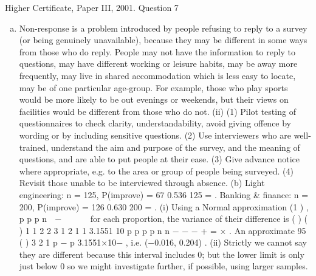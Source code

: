 \documentclass[a4paper,12pt]{article}
\begin{document}


Higher Certificate, Paper III, 2001. Question 7
\begin{enumerate}[(a)]
\item  Non-response is a problem introduced by people refusing to reply to a
survey (or being genuinely unavailable), because they may be different in
some ways from those who do reply. People may not have the information to
reply to questions, may have different working or leisure habits, may be away
more frequently, may live in shared accommodation which is less easy to
locate, may be of one particular age-group.
For example, those who play sports would be more likely to be out evenings
or weekends, but their views on facilities would be different from those who
do not.
(ii) (1) Pilot testing of questionnaires to check clarity,
understandability, avoid giving offence by wording or by
including sensitive questions.
(2) Use interviewers who are well-trained, understand the aim and
purpose of the survey, and the meaning of questions, and are
able to put people at their ease.
(3) Give advance notice where appropriate, e.g. to the area or
group of people being surveyed.
(4) Revisit those unable to be interviewed through absence.
(b) Light engineering: n = 125, P(improve) = 67 0.536
125
= .
Banking & finance: n = 200, P(improve) = 126 0.630
200
= .
(i) Using a Normal approximation (1 )
,
p p
p
n
 − 
 
 
for each proportion, the
variance of their difference is ( ) ( ) 1 1 2 2 3
1 2
1 1
3.1551 10
p p p p
n n
− − −
+ = × .
An approximate 95%
( ) 3
2 1 p − p  3.1551×10− , i.e. (−0.016, 0.204) .
(ii) Strictly we cannot say they are different because this interval
includes 0; but the lower limit is only just below 0 so we might investigate
further, if possible, using larger samples.
\end{enumerate}
\end{document}
